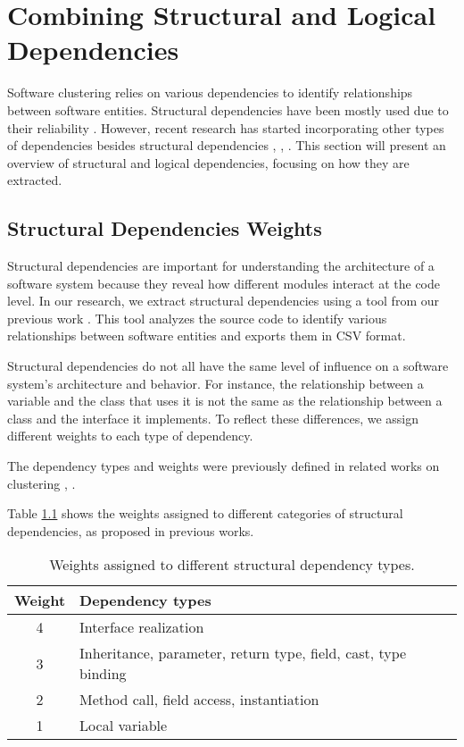 \chapter{Combining Structural and Logical Dependencies}
\label{sec:combining}

Software clustering relies on various dependencies to identify relationships between software entities. Structural dependencies have been mostly used due to their reliability \cite{SoraSem13}. However, recent research has started incorporating other types of dependencies besides structural dependencies \cite{lexical-dep}, \cite{b14}, \cite{b18}. This section will present an overview of structural and logical dependencies, focusing on how they are extracted.

\section{Structural Dependencies Weights}

Structural dependencies are important for understanding the architecture of a software system because they reveal how different modules interact at the code level. In our research, we extract structural dependencies using a tool from our previous work \cite{b4}. This tool analyzes the source code to identify various relationships between software entities and exports them in CSV format.

Structural dependencies do not all have the same level of influence on a software system’s architecture and behavior. For instance, the relationship between a variable and the class that uses it is not the same as the relationship between a class and the interface it implements. To reflect these differences, we assign different weights to each type of dependency.

The dependency types and weights were previously defined in related works on clustering \cite{SoraConti}, \cite{Finding-key-classes}.

Table \ref{tab:structural_weights} shows the weights assigned to different categories of structural dependencies, as proposed in previous works.

\begin{table}[htbp]
\centering
\begin{tabular}{|c|l|}
\hline
\textbf{Weight} & \textbf{Dependency types} \\
\hline
4 & Interface realization \\
3 & Inheritance, parameter, return type, field, cast, type binding \\
2 & Method call, field access, instantiation \\
1 & Local variable \\
\hline
\end{tabular}
\caption{Weights assigned to different structural dependency types. \cite{Finding-key-classes}}
\label{tab:structural_weights}
\end{table}

